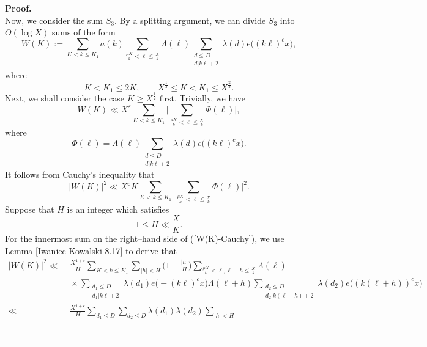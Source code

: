 \documentclass[a4paper,oneside,11pt]{article}%
\newenvironment{proof}[1][Proof]{\noindent \textbf{#1.} }{\  \rule{0.5em}{0.5em}}
\numberwithin{equation}{section}
\begin{document}
\begin{proof}
\begin{equation}
\end{equation}
Now, we consider the sum $S_3$. By a splitting argument, we can divide $S_3$ into $O(\log X)$ sums of the form
\begin{equation*}
  W(K):=\sum_{K<k\leqslant K_1}a(k)\sum_{\frac{\mu X}{k}<\ell\leqslant\frac{X}{k}}\Lambda(\ell)
  \sum_{\substack{d\leqslant D\\ d|k\ell+2}}\lambda(d)e\big((k\ell)^cx\big),
\end{equation*}
where
\begin{equation*}
  K<K_1\leqslant2K,\qquad  X^{\frac{1}{3}}\leqslant K<K_1\leqslant X^{\frac{2}{3}}.
\end{equation*}
Next, we shall consider the case $K\geqslant X^{\frac{1}{2}}$ first. Trivially, we have
\begin{equation*}
 W(K)\ll X^\varepsilon \sum_{K<k\leqslant K_1}\Bigg|\sum_{\frac{\mu X}{k}<\ell\leqslant\frac{X}{k}}\Phi(\ell)\Bigg|,
\end{equation*}
where
\begin{equation*}
\Phi(\ell)=\Lambda(\ell)\sum_{\substack{d\leqslant D\\ d|k\ell+2}}\lambda(d)e\big((k\ell)^cx\big).
\end{equation*}
It follows from Cauchy's inequality that
\begin{equation}\label{W(K)-Cauchy}
 |W(K)|^2\ll X^\varepsilon K\sum_{K<k\leqslant K_1}\Bigg|\sum_{\frac{\mu X}{k}<\ell\leqslant\frac{X}{k}}\Phi(\ell)\Bigg|^2.
\end{equation}
Suppose that $H$ is an integer which satisfies
\begin{equation*}
 1\leqslant H\ll \frac{X}{K}.
\end{equation*}
For the innermost sum on the right--hand side of (\ref{W(K)-Cauchy}), we use Lemma \ref{Iwaniec-Kowalski-8.17} to derive that
\begin{align*}
            \big|W(K)\big|^2
 \ll & \,\, \frac{X^{1+\varepsilon}}{H}\sum_{K<k\leqslant K_1}\sum_{|h|<H}\bigg(1-\frac{|h|}{H}\bigg)
            \sum_{\frac{\mu X}{k}<\ell,\ell+h\leqslant\frac{X}{k}}\Lambda(\ell)
                 \nonumber \\
 & \,\, \times\sum_{\substack{d_1\leqslant D\\ d_1|k\ell+2}}\lambda(d_1)e\big(-(k\ell)^cx\big)\Lambda(\ell+h)
         \sum_{\substack{d_2\leqslant D\\ d_2|k(\ell+h)+2}}\lambda(d_2)e\big((k(\ell+h))^cx\big)
                 \nonumber \\
 \ll & \,\, \frac{X^{1+\varepsilon}}{H}\sum_{d_1\leqslant D}\sum_{d_2\leqslant D}\lambda(d_1)\lambda(d_2)\sum_{|h|<H}

\end{align*}
\end{proof}
\end{document}
